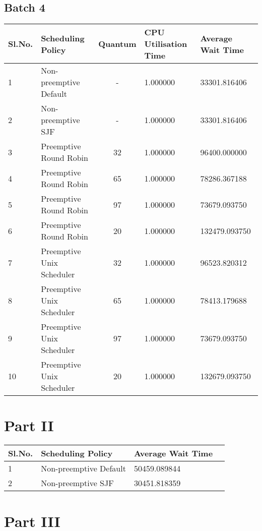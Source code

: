\documentclass{article}
\begin{document}
\subsection{Batch 4}
\begin{center}
    \begin{tabular}{| l | l | c | l | l |}
    \hline
    Sl.No. & Scheduling Policy & Quantum & CPU Utilisation Time & Average Wait Time \\ \hline
    1 & Non-preemptive Default & - & 1.000000 & 33301.816406 \\
    2 & Non-preemptive SJF & - & 1.000000 & 33301.816406 \\
    3 & Preemptive Round Robin & 32 & 1.000000 & 96400.000000 \\
    4 & Preemptive Round Robin & 65 & 1.000000 & 78286.367188 \\
    5 & Preemptive Round Robin & 97 & 1.000000 & 73679.093750 \\
    6 & Preemptive Round Robin & 20 & 1.000000 & 132479.093750 \\
    7 & Preemptive Unix Scheduler & 32 & 1.000000 & 96523.820312 \\
    8 & Preemptive Unix Scheduler & 65 & 1.000000 & 78413.179688 \\
    9 & Preemptive Unix Scheduler & 97 & 1.000000 & 73679.093750 \\
    10 & Preemptive Unix Scheduler & 20 & 1.000000 & 132679.093750 \\
    \hline
    \end{tabular}
\end{center}
\section{Part II}
\begin{center}
    \begin{tabular}{| l | l | l | l |}
    \hline
    Sl.No. & Scheduling Policy & Average Wait Time \\ \hline
    1 & Non-preemptive Default & 50459.089844 \\
    2 & Non-preemptive SJF & 30451.818359 \\
    \hline
    \end{tabular}
\end{center}
\section{Part III}
\end{document}
